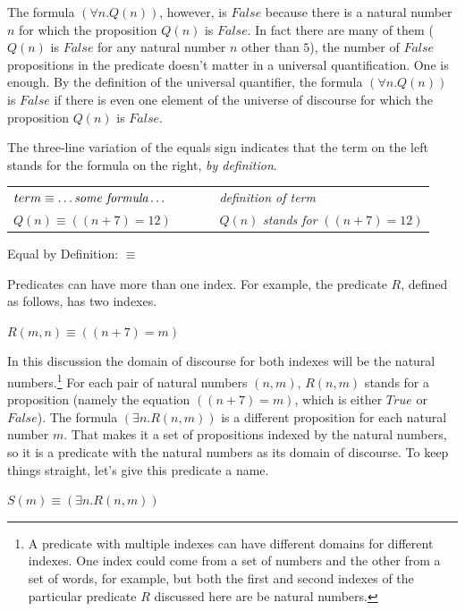 {The formula $(\forall n.Q(n))$, however, is $False$
because there is a natural number $n$ for which
the proposition $Q(n)$ is $False$.
In fact there are many of them
($Q(n)$ is $False$ for any natural number $n$ other than $5$),
the number of $False$ propositions in the predicate doesn't matter
in a universal quantification. One is enough.
By the definition of
the universal quantifier, the formula $(\forall n.Q(n))$
is $False$ if there is even one element of the
universe of discourse for which the proposition
$Q(n)$ is $False$.

\begin{aside}
The three-line variation of the equals sign
indicates that the term on the left stands
for the formula on the right, \emph{by definition}.
\begin{center}
\begin{tabular}{ll}
$term \equiv \dots \emph{some formula} \dots$ & ~~~~~ \emph{definition of term} \\
$Q(n) \equiv ((n + 7) = 12)$                  & ~~~~~ $Q(n)$ \emph{stands for} $((n + 7) = 12)$ \\
\end{tabular}
\end{center}
\caption{Equal by Definition: $\equiv$}
\label{aside:ch02-three-line-equal}
\end{aside}

Predicates can have more than one index.
For example, the predicate $R$,
defined as follows, has two indexes.
\begin{center}
$R(m, n) \equiv ((n + 7) = m)$
\end{center}
In this discussion the domain of discourse
for both indexes will be the natural numbers.\footnote{A
predicate with multiple indexes can
have different domains for different indexes.
One index could come from a set of numbers
and the other from a set of words, for example,
but both the first and second indexes
of the particular predicate $R$ discussed here
are be natural numbers.}
For each pair of natural numbers $(n, m)$,
$R(n, m)$ stands for a proposition (namely the
equation $((n + 7) = m)$, which is either $True$ or $False$).
The formula $(\exists n.R(n,m))$ is a different
proposition for each natural number $m$.
That makes it a set of propositions indexed by the natural numbers,
so it is a predicate with the natural numbers as its domain of discourse.
To keep things straight, let's give this predicate a name.
\begin{center}
$S(m) \equiv (\exists n.R(n,m))$
\end{center}

}
